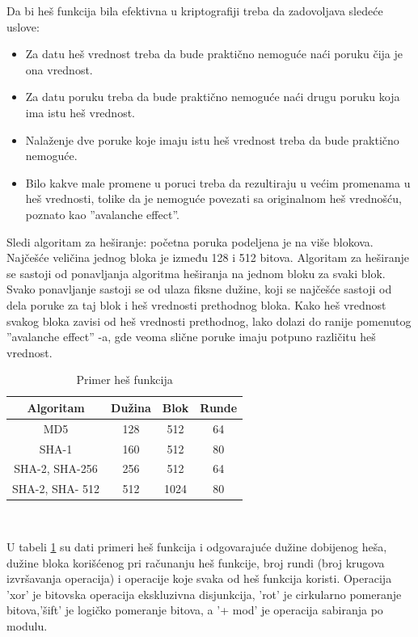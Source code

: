 \documentclass[a4paper]{article}
\begin{document}
Da bi heš funkcija bila efektivna u kriptografiji treba da zadovoljava sledeće uslove:
\begin{itemize}
\item Za datu heš vrednost treba da bude praktično nemoguće naći poruku čija je ona vrednost.
\item Za datu poruku treba da bude praktično nemoguće naći drugu poruku koja ima istu heš vrednost.
\item Nalaženje dve poruke koje imaju istu heš vrednost treba da bude praktično nemoguće. 
\item Bilo kakve male promene u poruci treba da rezultiraju u većim promenama u heš vrednosti, tolike da je nemoguće povezati sa originalnom heš vrednošću, poznato kao ''avalanche effect''.
\end{itemize}

Sledi algoritam za heširanje: početna poruka podeljena je na više blokova. Najčešće veličina jednog bloka je između 128 i 512 bitova. Algoritam za heširanje se sastoji od ponavljanja algoritma heširanja na jednom bloku za svaki blok. Svako ponavljanje sastoji se od ulaza fiksne dužine, koji se najčešće sastoji od dela poruke za taj blok i heš vrednosti prethodnog bloka. Kako heš vrednost svakog bloka zavisi od heš vrednosti prethodnog, lako dolazi do ranije pomenutog ''avalanche effect'' -a, gde veoma slične poruke imaju potpuno različitu heš vrednost.


\begin{table}[H]
\centering
 \begin{tabular}{|c| c| c| c|} 
 \hline
 Algoritam & Dužina & Blok & Runde\\ [0.5ex]
 \hline
 MD5 & 128 & 512 & 64\\ 
 \hline
 SHA-1 & 160 & 512 & 80\\ 
 \hline
 SHA-2, SHA-256 & 256 & 512 & 64\\
  \hline
 SHA-2, SHA- 512 & 512 & 1024 & 80\\
 \hline
\end{tabular}\vspace{0.5cm}\\
\caption{Primer heš funkcija}
\label{fig:hash_funkcije}
\end{table}
U tabeli \ref{fig:hash_funkcije} su dati primeri heš funkcija i odgovarajuće dužine dobijenog heša, dužine bloka korišćenog pri računanju heš funkcije, broj rundi (broj krugova izvršavanja operacija) i operacije koje svaka od heš funkcija koristi. Operacija 'xor' je bitovska operacija ekskluzivna disjunkcija, 'rot' je cirkularno pomeranje bitova,'šift' je logičko pomeranje bitova, a '+ mod' je operacija sabiranja po modulu.
\end{document}
